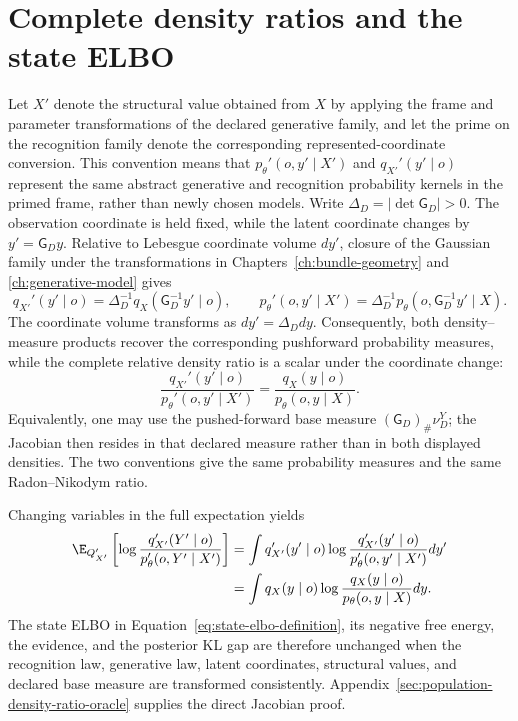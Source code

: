 \section{Complete density ratios and the state ELBO}

Let \(X'\) denote the structural value obtained from \(X\) by applying the frame and parameter transformations of the declared generative family, and let the prime on the recognition family denote the corresponding represented-coordinate conversion. This convention means that \(p_\theta'(o,y'\mid X')\) and \(q_{X'}'(y'\mid o)\) represent the same abstract generative and recognition probability kernels in the primed frame, rather than newly chosen models. Write \(\Delta_D=|\det\mathsf G_D|>0\). The observation coordinate is held fixed, while the latent coordinate changes by \(y'=\mathsf G_Dy\). Relative to Lebesgue coordinate volume \(dy'\), closure of the Gaussian family under the transformations in Chapters~\ref{ch:bundle-geometry} and \ref{ch:generative-model} gives
\begin{equation}
q_{X'}'(y'\mid o)
=\Delta_D^{-1}q_X(\mathsf G_D^{-1}y'\mid o),
\qquad
p_\theta'(o,y'\mid X')
=\Delta_D^{-1}p_\theta(o,\mathsf G_D^{-1}y'\mid X).
\label{eq:population-density-pushforward-laws}
\end{equation}
The coordinate volume transforms as \(dy'=\Delta_Ddy\). Consequently, both density--measure products recover the corresponding pushforward probability measures, while the complete relative density ratio is a scalar under the coordinate change:
\begin{equation}
\frac{q_{X'}'(y'\mid o)}{p_\theta'(o,y'\mid X')}
=\frac{q_X(y\mid o)}{p_\theta(o,y\mid X)}.
\label{eq:complete-density-ratio-gauge-invariance}
\end{equation}
Equivalently, one may use the pushed-forward base measure \((\mathsf G_D)_\#\nu_D^Y\); the Jacobian then resides in that declared measure rather than in both displayed densities. The two conventions give the same probability measures and the same Radon--Nikodym ratio.

Changing variables in the full expectation yields
\begin{align}
\E_{Q_{X'}'}\left[
\log\frac{q_{X'}'(Y'\mid o)}{p_\theta'(o,Y'\mid X')}
\right]
&=\int q_{X'}'(y'\mid o)
\log\frac{q_{X'}'(y'\mid o)}{p_\theta'(o,y'\mid X')}dy'
\notag\\
&=\int q_X(y\mid o)
\log\frac{q_X(y\mid o)}{p_\theta(o,y\mid X)}dy.
\label{eq:complete-free-energy-gauge-invariance}
\end{align}
The state ELBO in Equation~\eqref{eq:state-elbo-definition}, its negative free energy, the evidence, and the posterior KL gap are therefore unchanged when the recognition law, generative law, latent coordinates, structural values, and declared base measure are transformed consistently. Appendix~\ref{sec:population-density-ratio-oracle} supplies the direct Jacobian proof.

